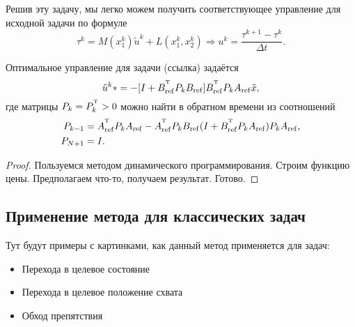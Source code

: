 \begin{remark}
    Решив эту задачу, мы легко можем получить соответствующее управление для исходной задачи по формуле
    \begin{equation}
        \tau^k = M(x_1^k)\tilde u^k + L(x_1^k, x_2^k) \Longrightarrow u^k = \frac{\tau^{k+1} - \tau^{k}}{\Delta t}.
    \end{equation}    
\end{remark}

\begin{theorem}
    Оптимальное управление для задачи (ссылка) задаётся
    \begin{equation}
        \tilde u^k* = -[I + B_{\mathrm{ref}}^{^\mathrm{T}}P_kB_{\mathrm{ref}}]B_{\mathrm{ref}}^{^\mathrm{T}} P_k A_{\mathrm{ref}} \tilde x,
    \end{equation}
    где матрицы $P_k = P_k^{^\mathrm{T}} > 0$ можно найти в обратном времени из соотношений
    \begin{equation}
        \begin{aligned}
            P_{k-1} &= A_{\mathrm{ref}}^{^\mathrm{T}} P_k A_{\mathrm{ref}} - A_{\mathrm{ref}}^{^\mathrm{T}} P_k B_{\mathrm{ref}}(I + B_{\mathrm{ref}}^{^\mathrm{T}} P_k A_{\mathrm{ref}}) P_k A_{\mathrm{ref}},
            \\
            P_{N+1} &= I.
        \end{aligned}
    \end{equation}
\end{theorem}

\begin{proof}

    Пользуемся методом динамического программирования. Строим функцию цены. Предполагаем что-то, получаем результат. Готово.

\end{proof}

\subsection{Применение метода для классических задач}

Тут будут примеры с картинками, как данный метод применяется для задач:
\begin{itemize}
    \item Перехода в целевое состояние
    \item Перехода в целевое положение схвата
    \item Обход препятствия
\end{itemize}